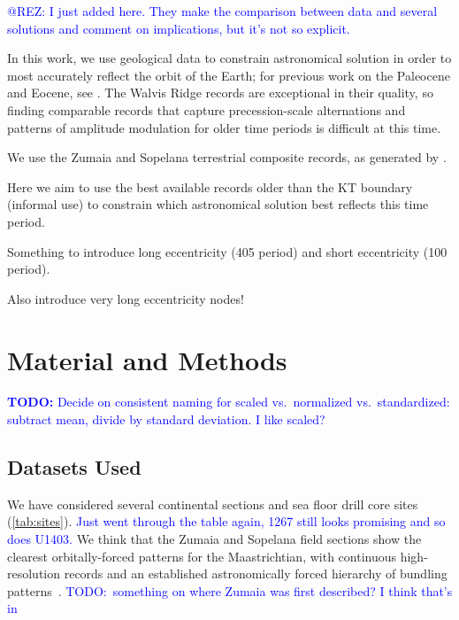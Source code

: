 \documentclass[draft]{agujournal2019}
\newcommand{\ijk}{\textcolor{blue}}
\begin{document}
\ijk{@REZ: I just added \cite{Westerhold2017} here. They make the comparison between data and several solutions and comment on implications, but it's not so explicit.}

In this work, we use geological data to constrain astronomical solution in order to most accurately reflect the orbit of the Earth; for previous work on the Paleocene and Eocene, see .
The Walvis Ridge records are exceptional in their quality, so finding comparable records that capture precession-scale alternations and patterns of amplitude modulation for older time periods is difficult at this time.

We use the Zumaia and Sopelana terrestrial composite records, as generated by .

Here we aim to use the best available records older than the \gls{KT} boundary (informal use) to constrain which astronomical solution best reflects this time period.

Something to introduce long eccentricity (\qty{405}{\kiloyear} period) and short eccentricity (\qty{100}{\kiloyear} period).

Also introduce very long eccentricity nodes!


\section{Material and Methods}\label{sec:mm}

\ijk{\textbf{TODO:} Decide on consistent naming for scaled vs.\ normalized vs.\ standardized: subtract mean, divide by standard deviation. I like scaled?}

\subsection{Datasets Used}\label{sec:data}

We have considered several continental sections and sea floor drill core sites (\cref{tab:sites}).
\ijk{Just went through the table again, 1267 still looks promising and so does U1403.}
We think that the Zumaia and Sopelana field sections show the clearest orbitally-forced patterns for the Maastrichtian, with continuous high-resolution records and an established astronomically forced hierarchy of bundling patterns~\cite{Batenburg2012,Batenburg2014}.
\ijk{TODO:\ something on where Zumaia was first described? I think that's in \cite{Pujalte1993}}
\end{document}
